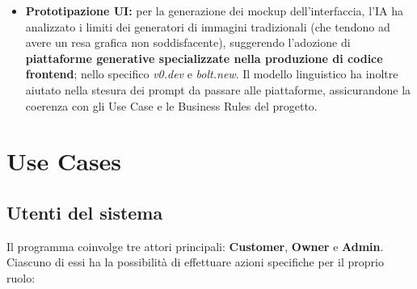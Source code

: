 \documentclass[a4paper,11pt]{article}
\begin{document}
\begin{itemize}
	\item \textbf{Prototipazione UI:} per la generazione dei mockup dell'interfaccia, l'IA ha analizzato i limiti dei generatori di immagini tradizionali (che tendono ad avere un resa grafica non soddisfacente), suggerendo l'adozione di \textbf{piattaforme generative specializzate nella produzione di codice frontend}; nello specifico \textit{v0.dev} e \textit{bolt.new}. Il modello linguistico ha inoltre aiutato nella stesura dei prompt da passare alle piattaforme, assicurandone la coerenza con gli Use Case e le Business Rules del progetto.
\end{itemize}

\newpage

\section{Use Cases}

\subsection{Utenti del sistema}

Il programma coinvolge tre attori principali: \textbf{Customer}, \textbf{Owner} e \textbf{Admin}. Ciascuno di essi ha la possibilità di effettuare azioni specifiche per il proprio ruolo:
\end{document}

